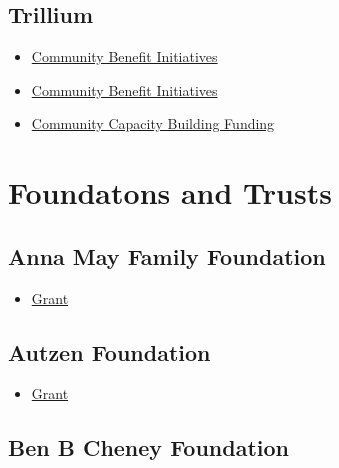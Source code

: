 \documentclass[
  letterpaper,
  DIV=11,
  numbers=noendperiod]{scrreprt}
\providecommand{\tightlist}{%
  \setlength{\itemsep}{0pt}\setlength{\parskip}{0pt}}\usepackage{longtable,booktabs,array}
\begin{document}
\subsection{Trillium}\label{trillium}

\begin{itemize}
\tightlist
\item
  \href{https://www.prnewswire.com/news-releases/trillium-community-health-plan-announces-request-for-applications-for-2023-small-grants-for-community-benefit-initiatives-301845411.html}{Community
  Benefit Initiatives}
\item
  \href{https://www.trilliumohp.com/supporting-oregon-communities/community-benefit-initiatives.html}{Community
  Benefit Initiatives}
\item
  \href{https://www.trilliumohp.com/supporting-oregon-communities/health-related-social-needs/community-capacity-building-funding.html}{Community
  Capacity Building Funding}
\end{itemize}

\section{Foundatons and Trusts}\label{foundatons-and-trusts}

\subsection{Anna May Family
Foundation}\label{anna-may-family-foundation}

\begin{itemize}
\tightlist
\item
  \href{http://www.annamay.org/}{Grant}
\end{itemize}

\subsection{Autzen Foundation}\label{autzen-foundation}

\begin{itemize}
\tightlist
\item
  \href{https://www.autzenfoundation.org/deadlines}{Grant}
\end{itemize}

\subsection{Ben B Cheney Foundation}\label{ben-b-cheney-foundation}
\end{document}
